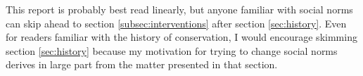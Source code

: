 \documentclass{report}
\begin{document}
This report is probably best read linearly, but anyone familiar with social norms can skip ahead to section \ref{subsec:interventions} after section \ref{sec:history}. Even for readers familiar with the history of conservation, I would encourage skimming section \ref{sec:history} because my motivation for trying to change social norms derives in large part from the matter presented in that section.

\tableofcontents


\end{document}
